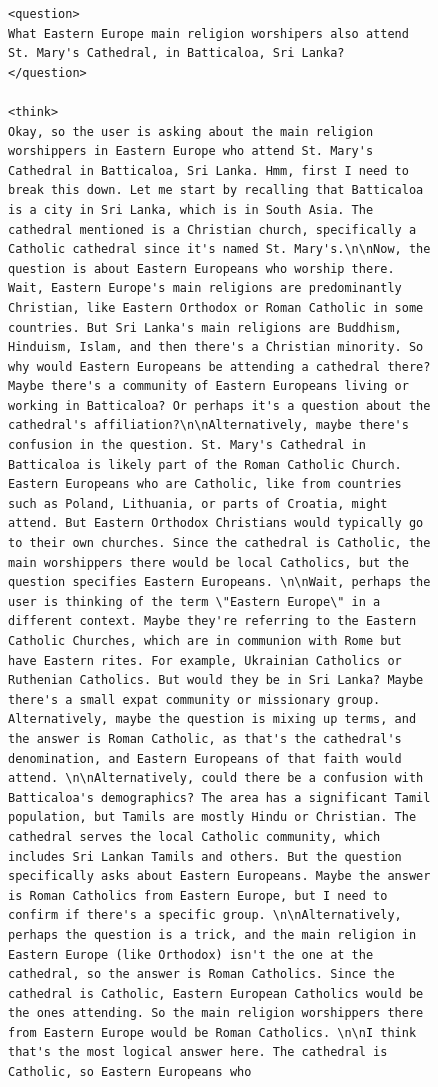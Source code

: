 \documentclass[11pt]{article}
\begin{document}
\begin{figure}[t]
\centering
\begin{tcolorbox}[title=QwQ-32B Example (\textbf{rt}), promptstyle]
\lstset{
    basicstyle=\normalfont\sffamily\scriptsize,
    breaklines=true,
    frame=none,
    columns=fullflexible,
}
\begin{lstlisting}[linewidth=\linewidth]
<question>
What Eastern Europe main religion worshipers also attend St. Mary's Cathedral, in Batticaloa, Sri Lanka?
</question>

<think>
Okay, so the user is asking about the main religion worshippers in Eastern Europe who attend St. Mary's Cathedral in Batticaloa, Sri Lanka. Hmm, first I need to break this down. Let me start by recalling that Batticaloa is a city in Sri Lanka, which is in South Asia. The cathedral mentioned is a Christian church, specifically a Catholic cathedral since it's named St. Mary's.\n\nNow, the question is about Eastern Europeans who worship there. Wait, Eastern Europe's main religions are predominantly Christian, like Eastern Orthodox or Roman Catholic in some countries. But Sri Lanka's main religions are Buddhism, Hinduism, Islam, and then there's a Christian minority. So why would Eastern Europeans be attending a cathedral there? Maybe there's a community of Eastern Europeans living or working in Batticaloa? Or perhaps it's a question about the cathedral's affiliation?\n\nAlternatively, maybe there's confusion in the question. St. Mary's Cathedral in Batticaloa is likely part of the Roman Catholic Church. Eastern Europeans who are Catholic, like from countries such as Poland, Lithuania, or parts of Croatia, might attend. But Eastern Orthodox Christians would typically go to their own churches. Since the cathedral is Catholic, the main worshippers there would be local Catholics, but the question specifies Eastern Europeans. \n\nWait, perhaps the user is thinking of the term \"Eastern Europe\" in a different context. Maybe they're referring to the Eastern Catholic Churches, which are in communion with Rome but have Eastern rites. For example, Ukrainian Catholics or Ruthenian Catholics. But would they be in Sri Lanka? Maybe there's a small expat community or missionary group. Alternatively, maybe the question is mixing up terms, and the answer is Roman Catholic, as that's the cathedral's denomination, and Eastern Europeans of that faith would attend. \n\nAlternatively, could there be a confusion with Batticaloa's demographics? The area has a significant Tamil population, but Tamils are mostly Hindu or Christian. The cathedral serves the local Catholic community, which includes Sri Lankan Tamils and others. But the question specifically asks about Eastern Europeans. Maybe the answer is Roman Catholics from Eastern Europe, but I need to confirm if there's a specific group. \n\nAlternatively, perhaps the question is a trick, and the main religion in Eastern Europe (like Orthodox) isn't the one at the cathedral, so the answer is Roman Catholics. Since the cathedral is Catholic, Eastern European Catholics would be the ones attending. So the main religion worshippers there from Eastern Europe would be Roman Catholics. \n\nI think that's the most logical answer here. The cathedral is Catholic, so Eastern Europeans who 
\end{lstlisting}
\end{tcolorbox}
\end{figure}
\end{document}
